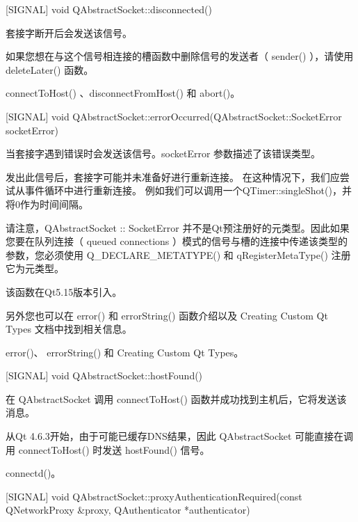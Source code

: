 [SIGNAL] void QAbstractSocket::disconnected()

套接字断开后会发送该信号。

\begin{notice}[警告]
如果您想在与这个信号相连接的槽函数中删除信号的发送者（ sender() ），请使用 deleteLater() 函数。
\end{notice}


\begin{notice}[另请查阅]
connectToHost() 、disconnectFromHost() 和 abort()。
\end{notice}



[SIGNAL] void
QAbstractSocket::errorOccurred(QAbstractSocket::SocketError
socketError)

当套接字遇到错误时会发送该信号。socketError 参数描述了该错误类型。

发出此信号后，套接字可能并未准备好进行重新连接。 在这种情况下，我们应尝试从事件循环中进行重新连接。 例如我们可以调用一个QTimer::singleShot()，并将0作为时间间隔。

请注意，QAbstractSocket :: SocketError 并不是Qt预注册好的元类型。因此如果您要在队列连接（ queued connections ）模式的信号与槽的连接中传递该类型的参数，您必须使用 Q\_DECLARE\_METATYPE() 和 qRegisterMetaType() 注册它为元类型。

该函数在Qt5.15版本引入。

另外您也可以在 error() 和 errorString() 函数介绍以及 Creating Custom Qt Types 文档中找到相关信息。

\begin{notice}[另请查阅]
error()、 errorString() 和 Creating Custom Qt Types。
\end{notice}


[SIGNAL] void QAbstractSocket::hostFound()

在 QAbstractSocket 调用 connectToHost() 函数并成功找到主机后，它将发送该消息。

\begin{notice}
从Qt 4.6.3开始，由于可能已缓存DNS结果，因此 QAbstractSocket 可能直接在调用 connectToHost() 时发送 hostFound() 信号。
\end{notice}



\begin{notice}[另请查阅]
connectd()。
\end{notice}

[SIGNAL] void QAbstractSocket::proxyAuthenticationRequired(const
QNetworkProxy \&proxy, QAuthenticator *authenticator)

